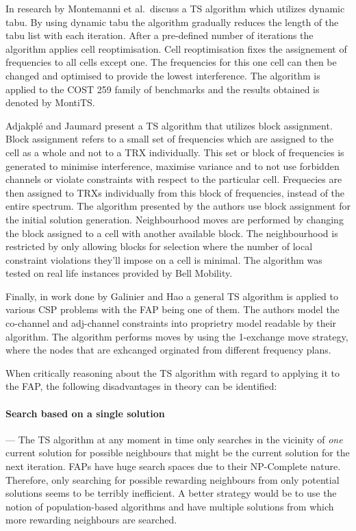 In research by Montemanni et al.\ discuss a \gls{TS} algorithm which utilizes dynamic tabu\cite{MontiTS}. By using dynamic tabu the algorithm gradually reduces the length of the tabu list with each iteration. After a pre-defined number of iterations the algorithm applies cell reoptimisation. Cell reoptimisation fixes the assignement of frequencies to all cells except one. The frequencies for this one cell can then be changed and optimised to provide the lowest interference\cite{MontiTS}. The algorithm is applied to the COST 259 family of benchmarks and the results obtained is denoted by MontiTS.

Adjakpl\'{e} and Jaumard present a TS algorithm that utilizes block assignment\cite{AdJa97}. Block assignment refers to a small set of frequencies which are assigned to the cell as a whole and not to a TRX individually. This set or block of frequencies is generated to minimise interference, maximise variance and to not use forbidden channels or violate constraints with respect to the particular cell. Frequecies are then assigned to TRXs individually from this block of frequencies, instead of the entire spectrum. The algorithm presented by the authors use block assignment for the initial solution generation. Neighbourhood moves are performed by changing the block assigned to a cell with another available block. The neighbourhood is restricted by only allowing blocks for selection where the number of local constraint violations they'll impose on a cell is minimal. The algorithm was tested on real life instances provided by Bell Mobility.

Finally, in work done by Galinier and Hao\cite{TSCSP} a general TS algorithm is applied to various CSP problems with the FAP being one of them. The authors model the co-channel and adj-channel constraints into proprietry model readable by their algorithm. The algorithm performs moves by using the 1-exchange move strategy, where the nodes that are exhcanged orginated from different frequency plans\cite{TSCSP}.

When critically reasoning about the \gls{TS} algorithm with regard to applying it to the \gls{FAP}, the following disadvantages in theory can be identified:
\paragraph{Search based on a single solution}
--- The \gls{TS} algorithm at any moment in time only searches in the vicinity of \emph{one} current solution for possible neighbours that might be the current solution for the next iteration. \gls{FAP}s have huge search spaces due to their NP-Complete nature. Therefore, only searching for possible rewarding neighbours from only potential solutions seems to be terribly inefficient. A better strategy would be to use the notion of population-based algorithms and have multiple solutions from which more rewarding neighbours are searched.
